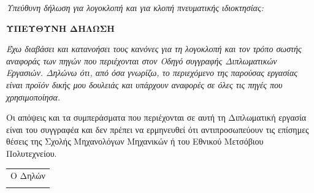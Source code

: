 





\hypersetup{pageanchor=false}

\hypersetup{pageanchor=true}

\newpage
\textit{Υπεύθυνη δήλωση για λογοκλοπή και για κλοπή πνευματικής ιδιοκτησίας:}
\vspace{1em}

\begin{plagiarismbox}
	\begin{center}
		\bfseries\large ΥΠΕΥΘΥΝΗ ΔΗΛΩΣΗ
	\end{center}
	\vspace{0.5em}

	\itshape
	Έχω διαβάσει και κατανοήσει τους κανόνες για τη λογοκλοπή και τον τρόπο σωστής αναφοράς των πηγών που περιέχονται στον Οδηγό συγγραφής Διπλωματικών Εργασιών. Δηλώνω ότι, από όσα γνωρίζω, το περιεχόμενο της παρούσας εργασίας είναι προϊόν δικής μου δουλειάς και υπάρχουν αναφορές σε όλες τις πηγές που χρησιμοποίησα.
	\medskip

	Οι απόψεις και τα συμπεράσματα που περιέχονται σε αυτή τη Διπλωματική εργασία είναι του συγγραφέα και δεν πρέπει να ερμηνευθεί ότι αντιπροσωπεύουν τις επίσημες θέσεις της Σχολής Μηχανολόγων Μηχανικών ή του Εθνικού Μετσόβιου Πολυτεχνείου.

	\vspace{2.5em}
	\normalfont
	\begin{flushright}
		\begin{tabular}{c}
			Ο Δηλών \\[1em]
			\textbf{\ThesisAuthor}
		\end{tabular}
	\end{flushright}
\end{plagiarismbox}

\newpage


\newpage
\tableofcontents
\clearpage

\clearpage

\clearpage

\clearpage
\setcounter{table}{0}

\clearpage

\clearpage

\clearpage

\clearpage
% 
\printbibliography

\clearpage
\listoffigures
{}
\clearpage
\listoftables
{}


